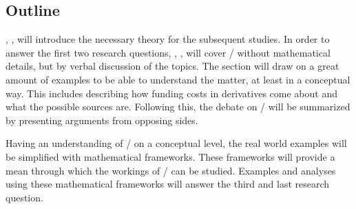 \documentclass[main.tex]{subfiles}
\begin{document}
    \subsection{Outline}

    , , 
    will introduce the necessary theory for the subsequent studies.
    In order to answer the first two research questions,
    , , 
    will cover \FVA/ without mathematical details, but by verbal discussion of the topics.
    The section will draw on a great amount of examples to be able to understand the matter, 
    at least in a conceptual way.
    This includes describing how funding costs in derivatives come about 
    and what the possible sources are.
    Following this, the debate on \FVA/ will be summarized
    by presenting arguments from opposing sides.

    Having an understanding of \FVA/ on a conceptual level,
    the real world examples will be simplified with mathematical frameworks.
    These frameworks will provide a mean through which the workings of \FVA/ can be studied.
    Examples and analyses using these mathematical frameworks
    will answer the third and last research question.
\end{document}
